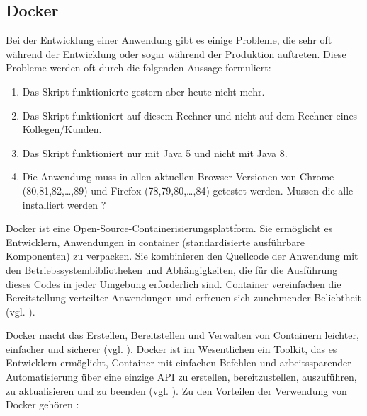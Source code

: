 \subsection{Docker}

Bei der Entwicklung einer Anwendung gibt es einige Probleme, die
sehr oft während der Entwicklung oder sogar während der Produktion
auftreten. Diese Probleme werden oft durch die folgenden Aussage
formuliert:

\begin{enumerate}
    \item Das Skript funktionierte gestern aber heute nicht mehr.
    \item Das Skript funktioniert auf diesem Rechner und nicht auf
    dem Rechner eines Kollegen/Kunden.
    \item Das Skript funktioniert nur mit Java 5 und nicht mit Java 8.
    \item Die Anwendung muss in allen aktuellen Browser-Versionen von Chrome (80,81,82,\ldots,89) und Firefox (78,79,80,\ldots,84) getestet werden.
    Mussen die alle installiert werden ?
\end{enumerate}

Docker ist eine Open-Source-Containerisierungsplattform. Sie
ermöglicht es Entwicklern, Anwendungen in \gls{container}
(standardisierte ausführbare Komponenten) zu verpacken.
Sie kombinieren den Quellcode der Anwendung mit den
Betriebssystembibliotheken und Abhängigkeiten, die für die
Ausführung dieses Codes in jeder Umgebung erforderlich sind.
Container vereinfachen die Bereitstellung verteilter Anwendungen und
erfreuen sich zunehmender Beliebtheit (vgl. \cite{docker}).

Docker macht das Erstellen, Bereitstellen und Verwalten von
Containern leichter, einfacher und sicherer (vgl. \cite{ibm-docker}).
Docker ist im Wesentlichen ein Toolkit, das es Entwicklern ermöglicht,
Container mit einfachen Befehlen und arbeitssparender Automatisierung
über eine einzige API zu erstellen, bereitzustellen, auszuführen,
zu aktualisieren und zu beenden (vgl. \cite{ibm-docker}). Zu den Vorteilen der Verwendung von
Docker gehören :

